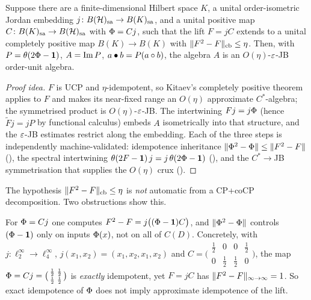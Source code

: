 \begin{theorem}\label{thm:dilation-compatible}
Suppose there are a finite-dimensional Hilbert space $K$, a unital
order-isometric Jordan embedding $j\colon B(\mathcal{H})_{\mathrm{sa}}\to B(K)_{\mathrm{sa}}$, and a unital
positive map $C\colon B(K)_{\mathrm{sa}}\to B(\mathcal{H})_{\mathrm{sa}}$ with $\Phi=Cj$, such that the
lift $F=jC$ extends to a unital completely positive map $B(K)\to B(K)$ with
$\lVert F^2-F \rVert_{\mathrm{cb}}\le\eta$. Then, with $P=\theta(2\Phi-\mathbf{1})$,
$A=\operatorname{Im} P$, $a\bullet b=P(a\circ b)$, the algebra $A$ is an $O(\eta)$-$\varepsilon$-JB
order-unit algebra.
\end{theorem}

\begin{proof}[Proof idea]
$F$ is UCP and $\eta$-idempotent, so Kitaev's completely positive theorem applies
to $F$ and makes its near-fixed range an $O(\eta)$ approximate $C^{*}$-algebra;
the symmetrised product is $O(\eta)$-$\varepsilon$-JB. The intertwining $Fj=j\Phi$
(hence $\widetilde F j=jP$ by functional calculus) embeds $A$ isometrically into
that structure, and the $\varepsilon$-JB estimates restrict along the embedding. Each of
the three steps is independently machine-validated: idempotence inheritance
$\lVert \Phi^2-\Phi \rVert\le\lVert F^2-F \rVert$
(), the spectral intertwining
$\theta(2F-\mathbf{1})\,j=j\,\theta(2\Phi-\mathbf{1})$
(), and the $C^{*}\!\to$JB
symmetrisation that supplies the $O(\eta)$ crux
().
\end{proof}

The hypothesis $\lVert F^2-F \rVert_{\mathrm{cb}}\le\eta$ is \emph{not} automatic from a
CP+coCP decomposition. Two obstructions show this.

\begin{proposition}\label{prop:doubling}
For $\Phi=Cj$ one computes $F^2-F=j\bigl((\Phi-\mathbf{1})C\bigr)$, and
$\lVert \Phi^2-\Phi \rVert$ controls $(\Phi-\mathbf{1})$ only on inputs $\Phi(x)$,
not on all of $C(D)$. Concretely, with $j\colon\ell^{\infty}_2\to\ell^{\infty}_4$,
$j(x_1,x_2)=(x_1,x_2,x_1,x_2)$ and
$C=\bigl(\begin{smallmatrix}\frac12&0&0&\frac12\\0&\frac12&\frac12&0\end{smallmatrix}\bigr)$,
the map $\Phi=Cj=\bigl(\begin{smallmatrix}\frac12&\frac12\\\frac12&\frac12\end{smallmatrix}\bigr)$
is \emph{exactly} idempotent, yet $F=jC$ has
$\lVert F^2-F \rVert_{\infty\to\infty}=1$. So exact idempotence of $\Phi$ does not
imply approximate idempotence of the lift.
\end{proposition}

